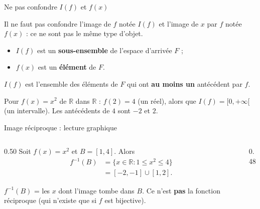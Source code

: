 \documentclass[aspectratio=169,11pt]{beamer}
\newcommand{\R}{\mathbb{R}}
\newcommand{\key}[1]{\textbf{\color{DarkBlue}#1}}
\newcommand{\important}[1]{\textbf{\color{DarkRed}#1}}
\begin{document}
\begin{frame}{Ne pas confondre $I(f)$ et $f(x)$}
	\begin{attentionbox}
		Il ne faut pas confondre l'image de $f$ notée $I(f)$ et l'image de $x$ par $f$
		notée $f(x)$ : ce ne sont pas le même type d'objet.
		\begin{itemize}
			\item $I(f)$ est un \key{sous-ensemble} de l'espace d'arrivée $F$ ;
			\item $f(x)$ est un \key{élément} de $F$.
		\end{itemize}
		$I(f)$ est l'ensemble des éléments de $F$ qui ont \important{au moins un} antécédent par $f$.
	\end{attentionbox}
	\vspace{0.2cm}
	\begin{exemplebox}
		Pour $f(x)=x^2$ de $\R$ dans $\R$ : $f(2)=4$ (un réel), alors que
		$I(f)=[0,+\infty[$ (un intervalle). Les antécédents de $4$ sont $-2$ et $2$.
	\end{exemplebox}
\end{frame}

\begin{frame}{Image réciproque : lecture graphique}
	\begin{columns}[c]
		\begin{column}{0.50\textwidth}
			Soit $f(x)=x^2$ et $B=[1,4]$. Alors
			\begin{align*}
				f^{-1}(B)
				&=\bigl\{x\in\R : 1\le x^2\le 4\bigr\}\\
				&=[-2,-1]\cup[1,2].
			\end{align*}
			\vspace{0.15cm}
			\begin{applicationbox}
				$f^{-1}(B)$ = les $x$ dont l'image tombe dans $B$.
				Ce n'est \important{pas} la fonction réciproque
				(qui n'existe que si $f$ est bijective).
			\end{applicationbox}
		\end{column}
		\begin{column}{0.48\textwidth}
		\end{column}
	\end{columns}
\end{frame}
\end{document}

